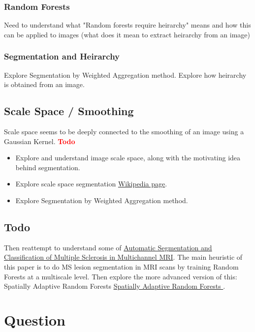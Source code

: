 \documentclass{report}
\begin{document}
\subsection{Random Forests}
Need to understand what "Random forests require heirarchy" means and how this can be applied to images (what does it mean to extract heirarchy from an image)
\subsection{Segmentation and Heirarchy}
Explore Segmentation by Weighted Aggregation method. Explore how heirarchy is obtained from an image.
\section{Scale Space / Smoothing}
Scale space seems to be deeply connected to the smoothing of an image using a Gaussian Kernel. 
\textbf{\textcolor{red}{Todo}}
\begin{itemize}
\item Explore and understand image scale space, along with the motivating idea behind segmentation. 
\item Explore scale space segmentation \href{https://en.wikipedia.org/wiki/Scale-space_segmentation}{Wikipedia page}.
\item Explore Segmentation by Weighted Aggregation method.
\end{itemize}

\section{Todo}
Then reattempt to understand some of \href{https://ieeexplore.ieee.org/stamp/stamp.jsp?tp=&arnumber=5238795}{Automatic Segmentation and Classification
of Multiple Sclerosis in Multichannel MRI}. The main heuristic of this paper is to do MS lesion segmentation in MRI scans by training Random Forests at a multiscale level. Then explore the more advanced version of this: Spatially Adaptive Random Forests \href{https://ieeexplore.ieee.org/document/6556781}{Spatially Adaptive Random Forests
}.

\chapter{Question}
\end{document}
